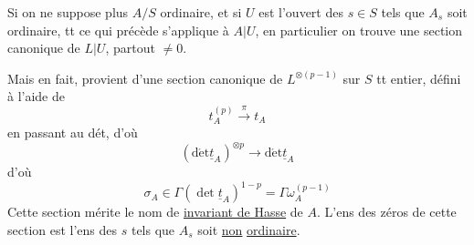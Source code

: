 Si on ne suppose plus  $A/S$ ordinaire, et si $U$ est l'ouvert des $s\in S$
tels que $A_s$ soit ordinaire, tt ce qui
précède s'applique à $A|U$, en particulier
on trouve une section canonique \inserted{$\sigma$} de
$L|U$, partout $\ne0$. 

Mais en fait,  provient d'une section
canonique de $L^{\otimes(p-1)}$ sur $S$ tt entier, défini
à l'aide de
\[
t_A^{(p)}\xrightarrow{\pi}t_A
\]
en passant au dét, d'où
\[
(\operatorname{d\acute et}\underline t_A)^{\otimes p}\longrightarrow\operatorname{d\acute et}\underline t_A
\]
d'où
\[
\sigma_A\in\Gamma(\operatorname{det}\underline t_A)^{1-p}=\Gamma\omega_A^{(p-1)}
\]
Cette section mérite le nom de \uline{invariant de
Hasse} de $A$. L'ens des zéros de cette
section est  l'ens des $s$ tels que
$A_s$ soit \uline{non} \uline{ordinaire}.

